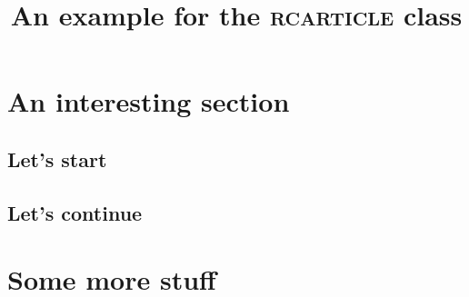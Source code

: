 \documentclass[english]{rcarticle}
\title{An example for the \textsc{rcarticle} class}
\begin{document}
\maketitle

\section{An interesting section}

\lipsum[1]

\subsection{Let's start}

\lipsum[2-5]

\subsection{Let's continue}

\lipsum[6-10]

\section{Some more stuff}

\lipsum[11-15]
\end{document}
